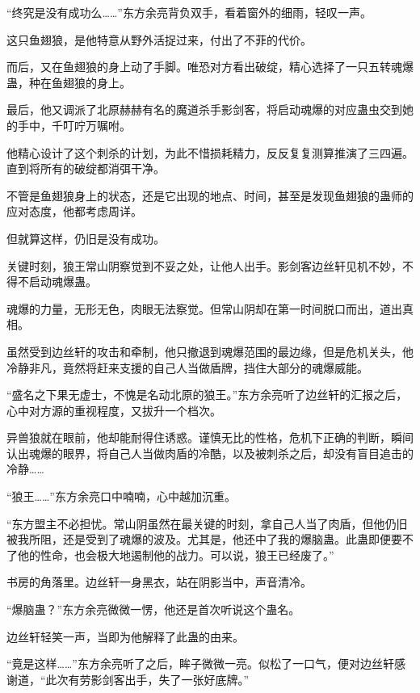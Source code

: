 
\begin{this_body}



“终究是没有成功么……”东方余亮背负双手，看着窗外的细雨，轻叹一声。

这只鱼翅狼，是他特意从野外活捉过来，付出了不菲的代价。

而后，又在鱼翅狼的身上动了手脚。唯恐对方看出破绽，精心选择了一只五转魂爆蛊，种在鱼翅狼的身上。

最后，他又调派了北原赫赫有名的魔道杀手影剑客，将启动魂爆的对应蛊虫交到她的手中，千叮咛万嘱咐。

他精心设计了这个刺杀的计划，为此不惜损耗精力，反反复复测算推演了三四遍。直到将所有的破绽都消弭干净。

不管是鱼翅狼身上的状态，还是它出现的地点、时间，甚至是发现鱼翅狼的蛊师的应对态度，他都考虑周详。

但就算这样，仍旧是没有成功。

关键时刻，狼王常山阴察觉到不妥之处，让他人出手。影剑客边丝轩见机不妙，不得不启动魂爆蛊。

魂爆的力量，无形无色，肉眼无法察觉。但常山阴却在第一时间脱口而出，道出真相。

虽然受到边丝轩的攻击和牵制，他只撤退到魂爆范围的最边缘，但是危机关头，他冷静非凡，竟然将赶来支援的自己人当做盾牌，挡住大部分的魂爆威能。

“盛名之下果无虚士，不愧是名动北原的狼王。”东方余亮听了边丝轩的汇报之后，心中对方源的重视程度，又拔升一个档次。

异兽狼就在眼前，他却能耐得住诱惑。谨慎无比的性格，危机下正确的判断，瞬间认出魂爆的眼界，将自己人当做肉盾的冷酷，以及被刺杀之后，却没有盲目追击的冷静……

“狼王……”东方余亮口中喃喃，心中越加沉重。

“东方盟主不必担忧。常山阴虽然在最关键的时刻，拿自己人当了肉盾，但他仍旧被我所阻，还是受到了魂爆的波及。尤其是，他还中了我的爆脑蛊。此蛊即便要不了他的性命，也会极大地遏制他的战力。可以说，狼王已经废了。”

书房的角落里。边丝轩一身黑衣，站在阴影当中，声音清冷。

“爆脑蛊？”东方余亮微微一愣，他还是首次听说这个蛊名。

边丝轩轻笑一声，当即为他解释了此蛊的由来。

“竟是这样……”东方余亮听了之后，眸子微微一亮。似松了一口气，便对边丝轩感谢道，“此次有劳影剑客出手，失了一张好底牌。”


\end{this_body}
